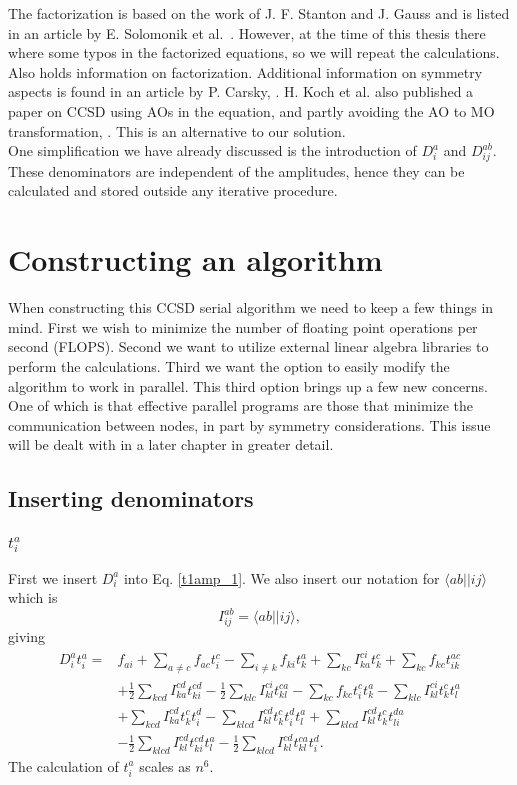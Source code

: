 \documentclass[a4paper,norsk,11pt,twoside]{report}
\begin{document}
The factorization is based on the work of J. F. Stanton and J. Gauss
and is listed in an article by E. Solomonik et
al.~\cite{ccsd_fac1}. However, at the time of this thesis there where
some typos in the factorized equations, so we will repeat the
calculations. Also \cite{ccsd_fac3} holds information on
factorization. Additional information on symmetry aspects is found in an
article by P. Carsky, \cite{ccsd_fac2}. H. Koch et al. also published
a paper on CCSD using AOs in the equation, and partly avoiding the AO
to MO transformation, \cite{ccsd_fac4}. This is an alternative to our
solution. \\

One simplification we have already discussed is the introduction of
$D_i^a$ and $D_{ij}^{ab}$. These denominators are independent of the
amplitudes, hence they can be calculated and stored outside any
iterative procedure.


\section{Constructing an algorithm}
When constructing this CCSD serial algorithm we need to keep  a few things in
mind. First we wish to minimize the number of floating point operations per second (FLOPS). Second we want to
utilize external linear algebra libraries to perform the
calculations. Third we want the option to easily modify the algorithm
to work in parallel. This third option brings up a few new concerns. One of
which is that effective parallel programs are those that minimize the
communication between nodes, in part by symmetry considerations. This
issue will be dealt with in a later chapter in greater detail.

\subsection{Inserting denominators}

\subsubsection{$t_i^a$}
First we insert $D_i^a$ into Eq. \eqref{t1amp_1}. We also insert our notation for $\langle ab || ij \rangle$ which is
\begin{equation}
I_{ij}^{ab} = \langle ab || ij \rangle,
\end{equation}
giving
\begin{align}
D_i^a t_i^a = & 
f_{ai} 
+ \sum_{a\not= c} f_{ac} t_i^c 
- \sum_{i \not= k} f_{ki} t_k^a 
+ \sum_{kc} I_{ka}^{ci} t_k^c 
+ \sum_{kc} f_{kc} t_{ik}^{ac} \nonumber \\ &
+ \frac{1}{2} \sum_{kcd} I_{ka}^{cd} t_{ki}^{cd} 
- \frac{1}{2} \sum_{klc} I_{kl}^{ci} t_{kl}^{ca} 
- \sum_{kc} f_{kc} t_i^c t_k^a 
- \sum_{klc} I_{kl}^{ci} t_k^c t_l^a \nonumber \\ & 
 + \sum_{kcd} I_{ka}^{cd} t_k^c t_i^d 
- \sum_{klcd} I_{kl}^{cd} t_k^c t_i^d t_l^a 
+ \sum_{klcd} I_{kl}^{cd} t_k^c t_{li}^{da} \nonumber \\ &
 - \frac{1}{2} \sum_{klcd} I_{kl}^{cd} t_{ki}^{cd} t_l^a 
- \frac{1}{2} \sum_{klcd} I_{kl}^{cd} t_{kl}^{ca} t_i^d
. 
\end{align}
The calculation of $t_i^a$ scales as $n^6$.
\end{document}
